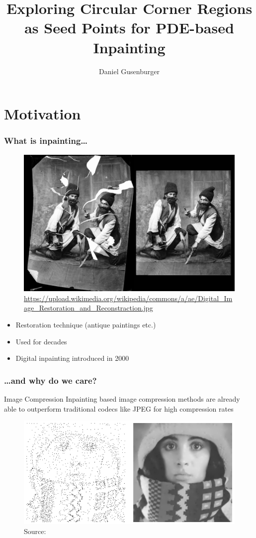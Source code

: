 \documentclass{beamer}
\title[Corner Region Inpainting]{Exploring Circular Corner Regions as Seed Points for PDE-based Inpainting}
\author{Daniel Gusenburger}
\begin{document}
\begin{frame}[t]
        \titlepage
\end{frame}


    \section{Motivation}
    \begin{frame}[t]
        \frametitle{What is inpainting\dots}
        \begin{figure}
            \centering
            \includegraphics[width=0.5\linewidth]{../thesis/Images/Digital_Image_Restoration_and_Reconstraction.jpg}
            \caption{\tiny{\url{https://upload.wikimedia.org/wikipedia/commons/a/ae/Digital_Image_Restoration_and_Reconstraction.jpg}}}
        \end{figure}
        \vspace{-1em}
        \begin{itemize}
            \item Restoration technique (antique paintings etc.)
            \item Used for decades
            \item Digital inpainting introduced in 2000
        \end{itemize}
    \end{frame}

    \begin{frame}[t]
        \frametitle{\dots and why do we care?}
        \begin{block}{Image Compression}
            Inpainting based image compression methods are already able to outperform traditional
            codecs like JPEG for high compression rates 
        \end{block}
        {
            \begin{figure}
                \centering
                \includegraphics[width=0.6\linewidth]{../thesis/Images/pde_example.png}
                \caption{Source:~\cite{hoeltgen15}}
            \end{figure}
        }
    \end{frame}
\end{document}
